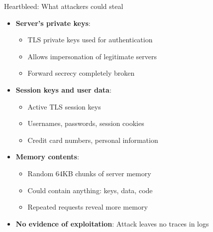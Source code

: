 \documentclass[aspectratio=169, lualatex, handout]{beamer}
\begin{document}
\begin{frame}{Heartbleed: What attackers could steal}
	\begin{itemize}[<+->]
		\item \textbf{Server's private keys}:
		      \begin{itemize}
			      \item TLS private keys used for authentication
			      \item Allows impersonation of legitimate servers
			      \item Forward secrecy completely broken
		      \end{itemize}
		\item \textbf{Session keys and user data}:
		      \begin{itemize}
			      \item Active TLS session keys
			      \item Usernames, passwords, session cookies
			      \item Credit card numbers, personal information
		      \end{itemize}
		\item \textbf{Memory contents}:
		      \begin{itemize}
			      \item Random 64KB chunks of server memory
			      \item Could contain anything: keys, data, code
			      \item Repeated requests reveal more memory
		      \end{itemize}
		\item \textbf{No evidence of exploitation}: Attack leaves no traces in logs
	\end{itemize}
\end{frame}
\end{document}

